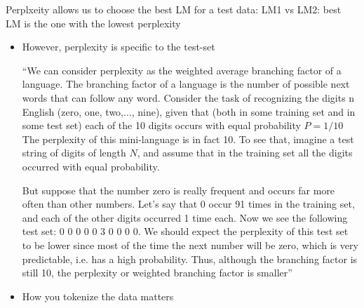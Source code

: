 \documentclass[11pt]{article}
\begin{document}
Perplxeity allows us to choose the best LM for a test data: LM1 vs LM2: best LM is the one with the lowest perplexity
\begin{itemize}
    \item However, perplexity is specific to the test-set
    
    ``We can consider perplexity as the weighted average branching factor of a language. The branching factor of a language is the number of possible next words that can follow any word. Consider the task of recognizing the digits n English (zero, one, two,..., nine), given that (both in some training set and in some test set) each of the 10 digits occurs with equal probability $P=1/10$  The perplexity of this mini-language is in fact 10. To see that, imagine a test string of digits of length $N$, and assume that in the training set all the digits occurred with equal probability.

    But suppose that the number zero is really frequent and occurs far more often than other numbers. Let’s say that 0 occur 91 times in the training set, and each of the other digits occurred 1 time each. Now we see the following test set: 0 0 0 0 0 3 0 0 0 0. We should expect the perplexity of this test set to be lower since most of the time the next number will be zero, which is very predictable, i.e. has a high probability. Thus, although the branching factor is still 10, the perplexity or weighted branching factor is smaller''~\cite{book-speech-and-language-processing}
    
    \item How you tokenize the data matters
\end{itemize}


\printbibliography
{}
\end{document}
